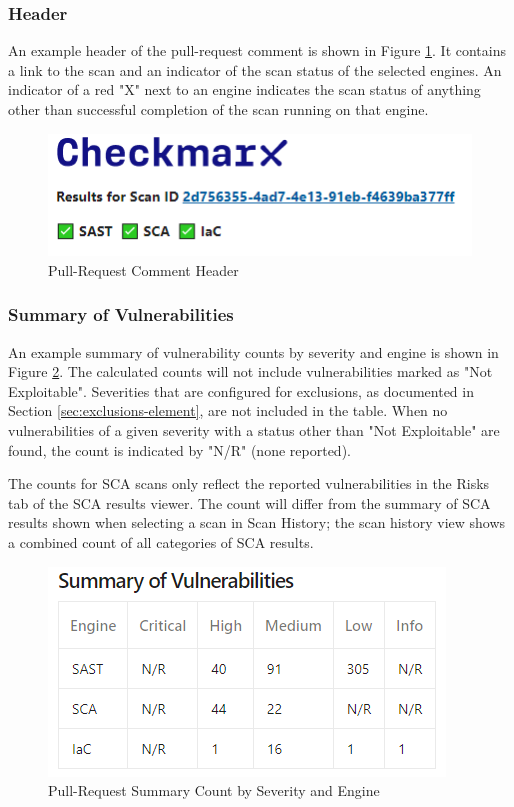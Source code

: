 \subsubsection{Header}

An example header of the pull-request comment is shown in Figure
\ref{fig:pr-header-section}.  It contains a link to the scan
and an indicator of the scan status of the selected engines.  An indicator
of a red "X" next to an engine indicates the scan status of anything other
than successful completion of the scan running on that engine.

\begin{figure}[ht]
    \includegraphics[width=\textwidth]{graphics/pr-header.png}
    \caption{Pull-Request Comment Header}
    \label{fig:pr-header-section}
\end{figure}

\subsubsection{Summary of Vulnerabilities}

An example summary of vulnerability counts by severity and engine 
is shown in Figure \ref{fig:pr-summary}.  The calculated counts will not
include vulnerabilities marked as "Not Exploitable".  Severities that
are configured for exclusions, as documented in Section
\ref{sec:exclusions-element}, are not included in the table.  When no 
vulnerabilities of a given severity with a status other than 
"Not Exploitable" are found, the count is indicated by "N/R" (none reported).


The counts for SCA scans only reflect the reported vulnerabilities in the
Risks tab of the SCA results viewer.  The count will differ from the summary
of SCA results shown when selecting a scan in Scan History; the scan
history view shows a combined count of all categories of SCA results.

\begin{figure}[ht]
    \includegraphics[width=\textwidth]{graphics/pr-summary.png}
    \caption{Pull-Request Summary Count by Severity and Engine}
    \label{fig:pr-summary}
\end{figure}


